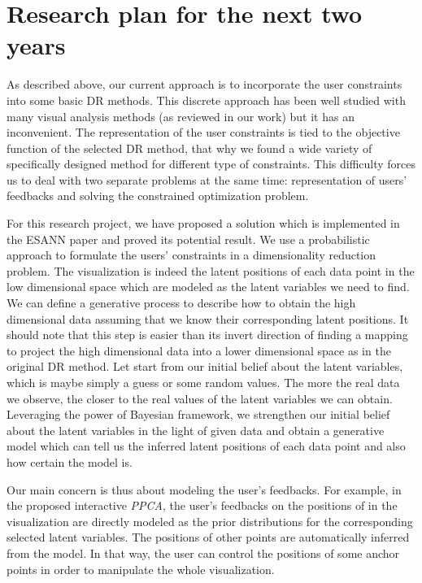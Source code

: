 \documentclass[11pt, a4paper]{article}
\begin{document}
\section{Research plan for the next two years}\label{sec:work}
As described above, our current approach is to incorporate the user constraints into some basic DR methods.
This discrete approach has been well studied with many visual analysis methods (as reviewed in our work) but it has an inconvenient.
The representation of the user constraints is tied to the objective function of the selected DR method, that why we found a wide variety of specifically designed method for different type of constraints.
This difficulty forces us to deal with two separate problems at the same time: representation of users' feedbacks and solving the constrained optimization problem.

For this research project, we have proposed a solution which is implemented in the ESANN paper and proved its potential result.
We use a probabilistic approach to formulate the users' constraints in a dimensionality reduction problem.
The visualization is indeed the latent positions of each data point in the low dimensional space which are modeled as the latent variables we need to find.
We can define a generative process to describe how to obtain the high dimensional data assuming that we know their corresponding latent positions.
It should note that this step is easier than its invert direction of finding a mapping to project the high dimensional data into a lower dimensional space as in the original DR method.
Let start from our initial belief about the latent variables, which is maybe simply a guess or some random values.
The more the real data we observe, the closer to the real values of the latent variables we can obtain.
Leveraging the power of Bayesian framework, we strengthen our initial belief about the latent variables in the light of given data and obtain a generative model
which can tell us the inferred latent positions of each data point and also how certain the model is.

Our main concern is thus about modeling the user's feedbacks.
For example, in the proposed interactive \emph{PPCA}, the user's feedbacks on the positions of in the visualization are directly modeled as the prior distributions for the corresponding selected latent variables.
The positions of other points are automatically inferred from the model.
In that way, the user can control the positions of some anchor points in order to manipulate the whole visualization.
\end{document}
